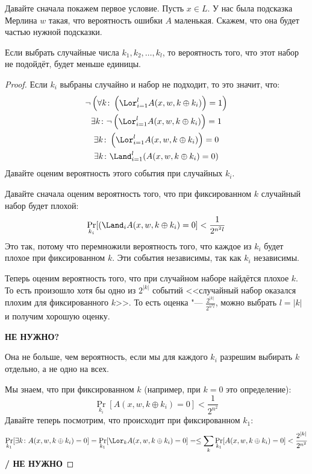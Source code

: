 	Давайте сначала покажем первое условие.
	Пусть $x \in L$.
	У нас была подсказка Мерлина $w$ такая, что вероятность ошибки $A$ маленькая.
	Скажем, что она будет частью нужной подсказки.
	\begin{assertion}
		Если выбрать случайные числа $k_1, k_2, \dots, k_l$, то вероятность того, что
		этот набор не подойдёт, будет меньше единицы.
	\end{assertion}
	\begin{proof}
		Если $k_i$ выбраны случайно и набор не подходит, то это значит, что:
		\begin{gather*}
			\lnot \left(\forall k \colon \left(\Lor_{i=1}^l A(x, w, k \oplus k_i)\right) = 1\right) \\
			\exists k \colon \lnot \left(\Lor_{i=1}^l A(x, w, k \oplus k_i)\right) = 1 \\
			\exists k \colon \left(\Lor_{i=1}^l A(x, w, k \oplus k_i)\right) = 0 \\
			\exists k \colon \Land_{i=1}^l (A(x, w, k \oplus k_i) = 0)
		\end{gather*}
		Давайте оценим вероятность этого события при случайных $k_i$.
		
		Давайте сначала оценим вероятность того, что при фиксированном $k$ случайный набор будет плохой:
		\[
			\Pr\limits_{k_i} [ (\Land_i A(x, w, k \oplus k_i) = 0 ] < \frac{1}{2^{n^2l}}
		\]
		Это так, потому что перемножили вероятность того, что каждое из $k_i$ будет плохое при фиксированном $k$.
		Эти события независимы, так как $k_i$ независимы.

		Теперь оценим вероятность того, что при случайном наборе найдётся плохое $k$.
		То есть произошло хотя бы одно из $2^{|k|}$ событий <<случайный набор оказался плохим для фиксированного $k$>>.
		То есть оценка "--- $\frac{2^{|k|}}{2^{n^2l}}$, можно выбрать $l=|k|$ и получим хорошую оценку.

		\textbf{НЕ НУЖНО?}

		Она не больше, чем вероятность, если мы для каждого $k_i$ разрешим выбирать $k$ отдельно,
		а не одно на всех.

		Мы знаем, что при фиксированном $k$ (например, при $k=0$ это определение):
		\[
			\Pr\limits_{k_i} [ A(x, w, k \oplus k_i) = 0 ] < \frac{1}{2^{n^2}}
		\]
		Давайте теперь посмотрим, что происходит при фиксированном $k_1$:
		\[
			\Pr\limits_{k_1} [ \exists k \colon A(x, w, k \oplus k_i) = 0 ] =
			\Pr\limits_{k_1} [ \Lor_k A(x, w, k \oplus k_i) = 0 ] =
			\le \sum_k \Pr\limits_{k_1} [ A(x, w, k \oplus k_i) = 0 ] <
			\frac{2^{|k|}}{2^{n^2}}
		\]
		\textbf{/ НЕ НУЖНО}


\end{proof}
